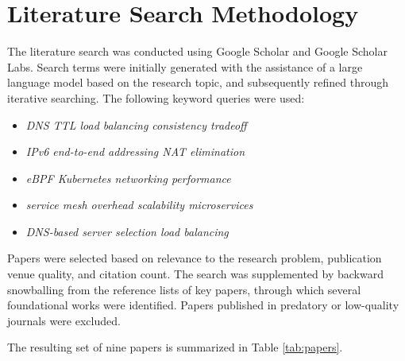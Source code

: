 \documentclass[a4paper,11pt]{article}
\begin{document}
\section{Literature Search Methodology}

The literature search was conducted using Google Scholar and Google Scholar Labs.
Search terms were initially generated with the assistance of a large language model based on the research topic, and subsequently refined through iterative searching.
The following keyword queries were used:
\begin{itemize}
    \item \textit{DNS TTL load balancing consistency tradeoff}
    \item \textit{IPv6 end-to-end addressing NAT elimination}
    \item \textit{eBPF Kubernetes networking performance}
    \item \textit{service mesh overhead scalability microservices}
    \item \textit{DNS-based server selection load balancing}
\end{itemize}
Papers were selected based on relevance to the research problem, publication venue quality, and citation count.
The search was supplemented by backward snowballing from the reference lists of key papers, through which several foundational works were identified.
Papers published in predatory or low-quality journals were excluded.

The resulting set of nine papers is summarized in Table \ref{tab:papers}.
\end{document}
